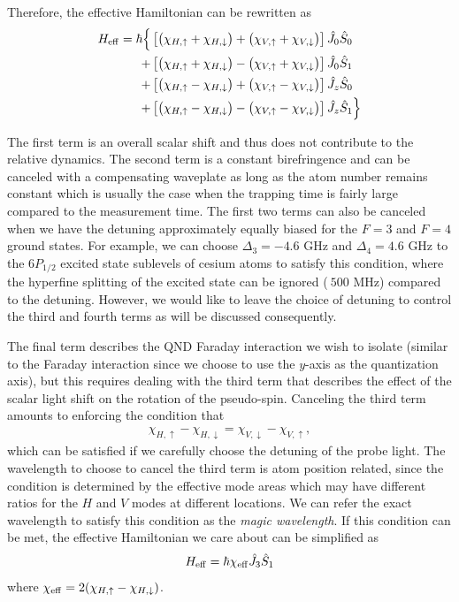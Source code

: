 \documentclass[preprint,aps,pra,onecolumn]{revtex4-1} %
\begin{document}
Therefore, the effective Hamiltonian can be rewritten as 
\begin{align}
H_{\rm eff} = \hbar \Big\{ & \left[ \big( \chi_{H,\uparrow} + \chi_{H,\downarrow}\big) + \big(\chi_{V,\uparrow} + \chi_{V,\downarrow}\big) \right] \hat{J}_0 \hat{S}_0 \nonumber \\
+ & \left[ \big( \chi_{H, \uparrow} + \chi_{H,\downarrow}\big) - \big( \chi_{V,\uparrow} + \chi_{V,\downarrow} \big)\right]  \hat{J}_0 \hat{S}_1 \nonumber \\
+ & \left[ \big( \chi_{H,\uparrow} - \chi_{H,\downarrow}\big) + \big(\chi_{V,\uparrow} - \chi_{V,\downarrow} \big) \right] \hat{J}_z \hat{S}_0 \nonumber \\
+ & \left[ \big( \chi_{H,\uparrow} - \chi_{H,\downarrow}\big) - \big(\chi_{V,\uparrow} - \chi_{V,\downarrow} \big) \right]  \hat{J}_z \hat{S}_1\Big\}
\end{align}

The first term is an overall scalar shift and thus does not contribute to the relative dynamics.  The second term is a constant birefringence and can be canceled with a compensating waveplate as long as the atom number remains constant which is usually the case when the trapping time is fairly large compared to the measurement time. The first two terms can also be canceled when we have the detuning approximately equally biased for the $ F=3 $ and $ F=4 $ ground states. 
For example, we  can choose $ \Delta_3=-4.6 $ GHz and $ \Delta_4=4.6 $ GHz to the $ 6P_{1/2} $ excited state sublevels of cesium atoms to satisfy this condition, where the hyperfine splitting of the excited state can be ignored ($ ~500 $ MHz) compared to the detuning. However, we would like to leave the choice of detuning to control the third and fourth terms as will be discussed consequently. 

The final term describes the QND Faraday interaction we wish to isolate (similar to the Faraday interaction since we choose to use the $ y $-axis as the quantization axis), but this requires dealing with the third term that describes the effect of the scalar light shift on the rotation of the pseudo-spin.  Canceling the third term amounts to enforcing the condition that
\begin{align}
	\chi_{H,\uparrow} - \chi_{H,\downarrow} = \chi_{V,\downarrow} - \chi_{V,\uparrow} ,
\end{align}
which can be satisfied if we carefully choose the detuning of the probe light. The wavelength to choose to cancel the third term is atom position related, since the condition is determined by the effective mode areas which may have different ratios for the $ H $ and $ V $ modes at different locations. We can refer the exact wavelength to satisfy this condition as the \textit{magic wavelength}. If this condition can be met, the effective Hamiltonian we care about can be simplified as
\begin{align}
	H_{\rm eff} = \hbar \chi_{\rm eff} \hat{J}_3 \hat{S}_1
\end{align}
where $\chi_{\rm eff} = 2(\chi_{H,\uparrow} - \chi_{H,\downarrow})$.  
\end{document}
